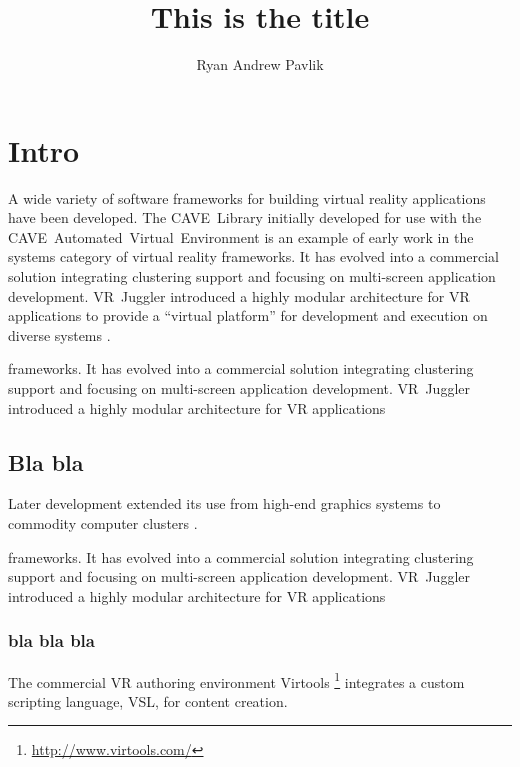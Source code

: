 \documentclass[draft]{rpisudiss}
\title{This is the title}
\author{Ryan Andrew Pavlik}
\begin{document}
\thispagestyle{empty}
\maketitle

\pagestyle{fancy}
\tableofcontents{}

{}
\listoffigures

{}
\listoftables


\chapter{Intro}


A wide variety of software frameworks for building virtual reality
applications have been developed. The CAVE~Library initially developed
for use with the CAVE~Automated~Virtual~Environment \cite{Cruz-Neira1993}
is an example of early work in the systems category of virtual reality
frameworks. It has evolved into a commercial solution integrating
clustering support and focusing on multi-screen application development.
VR~Juggler introduced a highly modular architecture for VR applications
to provide a ``virtual platform'' for development and execution
on diverse systems \cite{Bierbaum2001,Bierbaum2005}.

frameworks. It has evolved into a commercial solution integrating
clustering support and focusing on multi-screen application development.
VR~Juggler introduced a highly modular architecture for VR applications

\section{Bla bla}
Later development
extended its use from high-end graphics systems to commodity computer
clusters \cite{Allard2002,Bierbaum2005}.


frameworks. It has evolved into a commercial solution integrating
clustering support and focusing on multi-screen application development.
VR~Juggler introduced a highly modular architecture for VR applications

\subsection{bla bla bla}
The commercial
VR authoring environment Virtools%
\footnote{\url{http://www.virtools.com/}%
} integrates a custom scripting language, VSL, for content creation.
\end{document}
